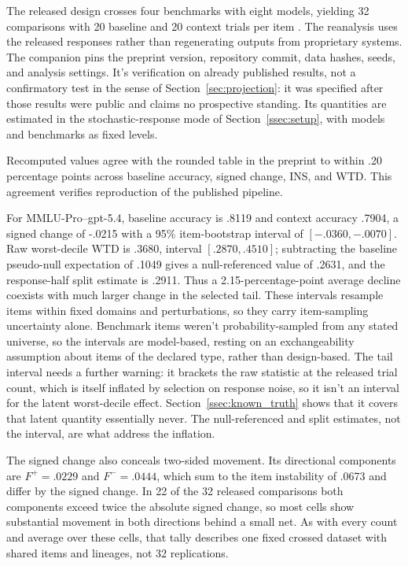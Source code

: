 \documentclass[12pt]{article}
\begin{document}
The released design crosses four benchmarks with eight models, yielding 32 comparisons with 20 baseline and 20 context trials per item \citep[3--4]{zhang2026illusionRobustness}. The reanalysis uses the released responses rather than regenerating outputs from proprietary systems. The companion pins the preprint version, repository commit, data hashes, seeds, and analysis settings. It's verification on already published results, not a confirmatory test in the sense of Section~\ref{sec:projection}: it was specified after those results were public and claims no prospective standing. Its quantities are estimated in the stochastic-response mode of Section~\ref{ssec:setup}, with models and benchmarks as fixed levels.

Recomputed values agree with the rounded table in the preprint to within .20 percentage points across baseline accuracy, signed change, INS, and WTD. This agreement verifies reproduction of the published pipeline.

For MMLU-Pro--gpt-5.4, baseline accuracy is .8119 and context accuracy .7904, a signed change of -.0215 with a 95\% item-bootstrap interval of \([-.0360,-.0070]\). Raw worst-decile WTD is .3680, interval \([.2870,.4510]\); subtracting the baseline pseudo-null expectation of .1049 gives a null-referenced value of .2631, and the response-half split estimate is .2911. Thus a 2.15-percentage-point average decline coexists with much larger change in the selected tail. These intervals resample items within fixed domains and perturbations, so they carry item-sampling uncertainty alone. Benchmark items weren't probability-sampled from any stated universe, so the intervals are model-based, resting on an exchangeability assumption about items of the declared type, rather than design-based. The tail interval needs a further warning: it brackets the raw statistic at the released trial count, which is itself inflated by selection on response noise, so it isn't an interval for the latent worst-decile effect. Section~\ref{ssec:known_truth} shows that it covers that latent quantity essentially never. The null-referenced and split estimates, not the interval, are what address the inflation.

The signed change also conceals two-sided movement. Its directional components are \(F^+=.0229\) and \(F^-=.0444\), which sum to the item instability of .0673 and differ by the signed change. In 22 of the 32 released comparisons both components exceed twice the absolute signed change, so most cells show substantial movement in both directions behind a small net. As with every count and average over these cells, that tally describes one fixed crossed dataset with shared items and lineages, not 32 replications.
\end{document}
